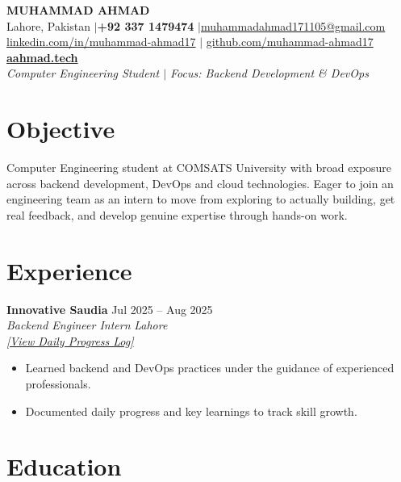 \documentclass[a4paper,10.5pt]{article}
\newcommand{\entrytitle}[2]{%
  \textbf{#1} \hfill #2%
}
\newcommand{\entrysubtitle}[2]{%
  \textit{#1} \hfill \textit{#2}%
}
\begin{document}
\begin{center}
  {\sffamily\Huge\textbf{MUHAMMAD AHMAD}} \\[5pt]
  Lahore, Pakistan \enspace$|$\enspace \textbf{+92 337 1479474} \enspace$|$\enspace \href{mailto:muhammadahmad171105@gmail.com}{muhammadahmad171105@gmail.com} \\[2pt]
  \href{https://linkedin.com/in/muhammad-ahmad17}{linkedin.com/in/muhammad-ahmad17} \enspace$|$\enspace 
  \href{https://github.com/muhammad-ahmad17}{github.com/muhammad-ahmad17} \\[4pt]
  \textbf{\href{https://aahmad.tech}{aahmad.tech}} \\[3pt]
  \textit{Computer Engineering Student $|$ Focus: Backend Development \& DevOps}
\end{center}

\section{Objective}
Computer Engineering student at COMSATS University with broad exposure across backend development, DevOps and cloud technologies. Eager to join an engineering team as an intern to move from exploring to actually building, get real feedback, and develop genuine expertise through hands-on work.
\section{Experience}

\entrytitle{Innovative Saudia}{Jul 2025 -- Aug 2025} \\
\entrysubtitle{Backend Engineer Intern}{Lahore} \\
{\small\textit{\href{https://github.com/Muhammad-Ahmad17/Internship}{[View Daily Progress Log]}}}
\normalsize
\begin{itemize}[nosep, leftmargin=1.5em, topsep=2pt]
  \item Learned backend and DevOps practices under the guidance of experienced professionals.
  \item Documented daily progress and key learnings to track skill growth.
\end{itemize}

\section{Education}
\end{document}
